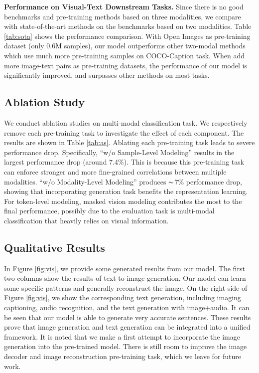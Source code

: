 \documentclass[10pt,twocolumn,letterpaper]{article}
\begin{document}
\textbf{Performance on Visual-Text Downstream Tasks.} Since there is no good benchmarks and pre-training methods based on three modalities, we compare with state-of-the-art methods on the benchmarks based on two modalities. Table \ref{tab:sota} shows the performance comparison. With Open Images as pre-training dataset (only 0.6M samples), our model outperforms other two-modal methods which use much more pre-training samples on COCO-Caption task. When add more image-text pairs as pre-training datasets, the performance of our model is significantly improved, and surpasses other methods on most tasks. 

\subsection{Ablation Study}
We conduct ablation studies on multi-modal classification task. We respectively remove each pre-training task to investigate the effect of each component. The results are shown in Table \ref{tab:as}. Ablating each pre-training task leads to severe performance drop. Specifically, ``w/o Sample-Level Modeling'' results in the largest performance drop (around 7.4\%). This is because this pre-training task can enforce stronger and more fine-grained correlations between multiple modalities. ``w/o Modality-Level Modeling'' produces $\thicksim$7\% performance drop, showing that incorporating generation task benefits the representation learning. For token-level modeling, masked vision modeling contributes the most to the final performance, possibly due to the evaluation task is multi-modal classification that heavily relies on visual information. 

\subsection{Qualitative Results}
In Figure \ref{fig:vis}, we provide some generated results from our model. The first two columns show the results of text-to-image generation. Our model can learn some specific patterns and generally reconstruct the image. On the right side of Figure \ref{fig:vis}, we show the corresponding text generation, including imaging captioning, audio recognition, and the text generation with image+audio. It can be seen that our model is able to generate very accurate sentences. These results prove that image generation and text generation can be integrated into a unified framework. It is noted that we make a first attempt to incorporate the image generation into the pre-trained model. There is still room to improve the image decoder and image reconstruction pre-training task, which we leave for future work.
\end{document}
